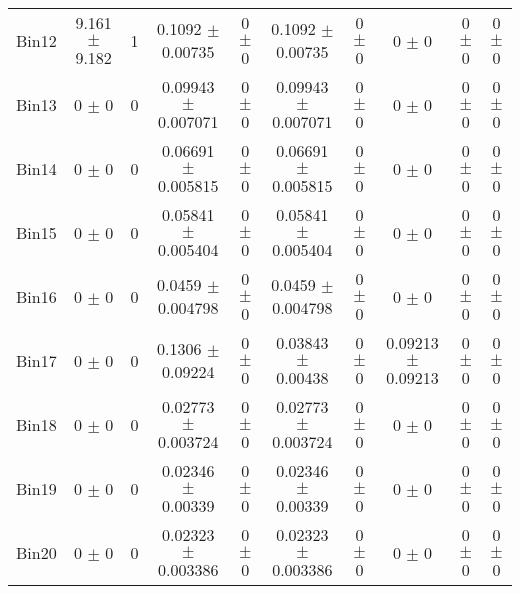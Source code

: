 \begin{tabular}{@{\extracolsep{4pt}}lccccccccc@{}}
     Bin12 & 9.161 $\pm$ 9.182 & 1 & 0.1092 $\pm$ 0.00735 & 0 $\pm$ 0 & 0.1092 $\pm$ 0.00735 & 0 $\pm$ 0 & 0 $\pm$ 0 & 0 $\pm$ 0 & 0 $\pm$ 0 \\ 
     Bin13 & 0 $\pm$ 0 & 0 & 0.09943 $\pm$ 0.007071 & 0 $\pm$ 0 & 0.09943 $\pm$ 0.007071 & 0 $\pm$ 0 & 0 $\pm$ 0 & 0 $\pm$ 0 & 0 $\pm$ 0 \\ 
     Bin14 & 0 $\pm$ 0 & 0 & 0.06691 $\pm$ 0.005815 & 0 $\pm$ 0 & 0.06691 $\pm$ 0.005815 & 0 $\pm$ 0 & 0 $\pm$ 0 & 0 $\pm$ 0 & 0 $\pm$ 0 \\ 
     Bin15 & 0 $\pm$ 0 & 0 & 0.05841 $\pm$ 0.005404 & 0 $\pm$ 0 & 0.05841 $\pm$ 0.005404 & 0 $\pm$ 0 & 0 $\pm$ 0 & 0 $\pm$ 0 & 0 $\pm$ 0 \\ 
     Bin16 & 0 $\pm$ 0 & 0 & 0.0459 $\pm$ 0.004798 & 0 $\pm$ 0 & 0.0459 $\pm$ 0.004798 & 0 $\pm$ 0 & 0 $\pm$ 0 & 0 $\pm$ 0 & 0 $\pm$ 0 \\ 
     Bin17 & 0 $\pm$ 0 & 0 & 0.1306 $\pm$ 0.09224 & 0 $\pm$ 0 & 0.03843 $\pm$ 0.00438 & 0 $\pm$ 0 & 0.09213 $\pm$ 0.09213 & 0 $\pm$ 0 & 0 $\pm$ 0 \\ 
     Bin18 & 0 $\pm$ 0 & 0 & 0.02773 $\pm$ 0.003724 & 0 $\pm$ 0 & 0.02773 $\pm$ 0.003724 & 0 $\pm$ 0 & 0 $\pm$ 0 & 0 $\pm$ 0 & 0 $\pm$ 0 \\ 
     Bin19 & 0 $\pm$ 0 & 0 & 0.02346 $\pm$ 0.00339 & 0 $\pm$ 0 & 0.02346 $\pm$ 0.00339 & 0 $\pm$ 0 & 0 $\pm$ 0 & 0 $\pm$ 0 & 0 $\pm$ 0 \\ 
     Bin20 & 0 $\pm$ 0 & 0 & 0.02323 $\pm$ 0.003386 & 0 $\pm$ 0 & 0.02323 $\pm$ 0.003386 & 0 $\pm$ 0 & 0 $\pm$ 0 & 0 $\pm$ 0 & 0 $\pm$ 0 \\ 
\hline\hline
  \end{tabular}
